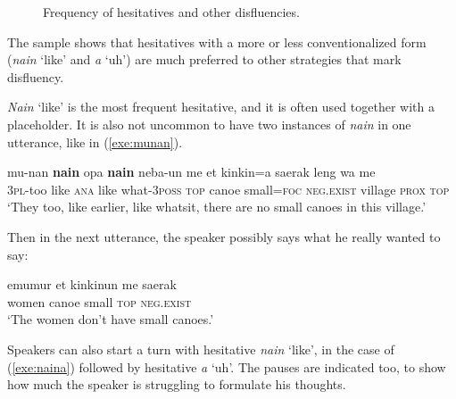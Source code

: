 \documentclass[output=paper,colorlinks,citecolor=brown
\ChapterDOI{10.5281/zenodo.15697587}
]{langscibook}
\begin{document}
\begin{figure}[ht]
	\caption{Frequency of hesitatives and other disfluencies.}\label{fig:hes}
\end{figure}

The sample shows that hesitatives with a more or less conventionalized form (\textit{nain} `like' and \textit{a} `uh') are much preferred to other strategies that mark disfluency.

\textit{Nain} `like' is the most frequent hesitative, and it is often used together with a placeholder. It is also not uncommon to have two instances of \textit{nain} in one utterance, like in (\ref{exe:munan}).

\ea \label{exe:munan}
\gll mu-nan \textbf{nain} opa \textbf{nain} neba-un me et kinkin=a saerak leng wa me\\
\textsc{3pl}-too like \textsc{ana} like what-\textsc{3poss} \textsc{top} canoe small=\textsc{foc} \textsc{neg.exist} village \textsc{prox} \textsc{top}\\
\glt `They too, like earlier, like whatsit, there are no small canoes in this village.'  
\z

Then in the next utterance, the speaker possibly says what he really wanted to say:

\ea \label{exe:emumur}
\gll emumur et kinkinun me saerak\\
women canoe small \textsc{top} \textsc{neg.exist}\\
\glt `The women don't have small canoes.'  
\z

Speakers can also start a turn with hesitative \textit{nain} `like', in the case of (\ref{exe:naina}) followed by hesitative \textit{a} `uh'. The pauses are indicated too, to show how much the speaker is struggling to formulate his thoughts.
\end{document}
